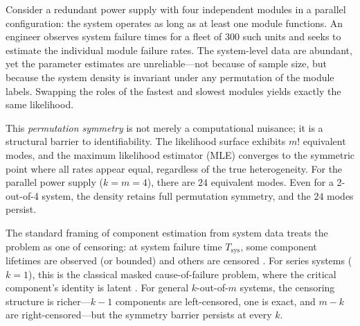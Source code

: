 \documentclass[12pt]{article}
\newcommand{\Tsys}{T_{\mathrm{sys}}}
\begin{document}
Consider a redundant power supply with four independent modules in a parallel
configuration: the system operates as long as at least one module functions.
An engineer observes system failure times for a fleet of 300 such units and
seeks to estimate the individual module failure rates.  The system-level
data are abundant, yet the parameter estimates are unreliable---not because
of sample size, but because the system density is invariant under any
permutation of the module labels.  Swapping the roles of the fastest and
slowest modules yields exactly the same likelihood.

This \emph{permutation symmetry} is not merely a computational nuisance; it
is a structural barrier to identifiability.  The likelihood surface exhibits
$m!$ equivalent modes, and the maximum likelihood estimator (MLE) converges
to the symmetric point where all rates appear equal, regardless of the true
heterogeneity.  For the parallel power supply ($k = m = 4$), there are $24$
equivalent modes.  Even for a 2-out-of-4 system, the density retains full
permutation symmetry, and the $24$ modes persist.

The standard framing of component estimation from system data treats the
problem as one of censoring: at system failure time $\Tsys$, some component
lifetimes are observed (or bounded) and others are censored
\citep{BarlowProschan1975, LawlessBook2003}.  For series systems ($k=1$),
this is the classical masked cause-of-failure problem, where the critical
component's identity is latent \citep{Miyakawa1984, LinUsherGuess1993}.  For
general $k$-out-of-$m$ systems, the censoring structure is richer---$k-1$
components are left-censored, one is exact, and $m-k$ are
right-censored---but the symmetry barrier persists at every $k$.
\end{document}
